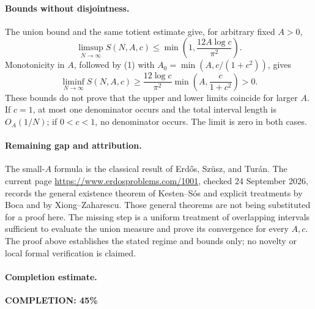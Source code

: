 \paragraph{Bounds without disjointness.}
The union bound and the same totient estimate give, for arbitrary fixed \(A>0\),
\[
 \limsup_{N\to\infty}S(N,A,c)
 \leq\min\left(1,\frac{12A\log c}{\pi^2}\right).
\]
Monotonicity in \(A\), followed by (1) with
\(A_0=\min(A,c/(1+c^2))\), gives
\[
 \liminf_{N\to\infty}S(N,A,c)
 \geq\frac{12\log c}{\pi^2}
          \min\left(A,\frac{c}{1+c^2}\right)>0.
\]
These bounds do not prove that the upper and lower limits coincide for larger \(A\). If \(c=1\), at most one denominator occurs and the total interval length is \(O_A(1/N)\); if \(0<c<1\), no denominator occurs. The limit is zero in both cases.

\paragraph{Remaining gap and attribution.}
The small-\(A\) formula is the classical result of Erd\H{o}s, Sz\"usz, and Tur\'an. The current page \url{https://www.erdosproblems.com/1001}, checked 24 September 2026, records the general existence theorem of Kesten--S\'os and explicit treatments by Boca and by Xiong--Zaharescu. Those general theorems are not being substituted for a proof here. The missing step is a uniform treatment of overlapping intervals sufficient to evaluate the union measure and prove its convergence for every \(A,c\). The proof above establishes the stated regime and bounds only; no novelty or local formal verification is claimed.

\paragraph{Completion estimate.}
\textbf{COMPLETION: 45\%}
